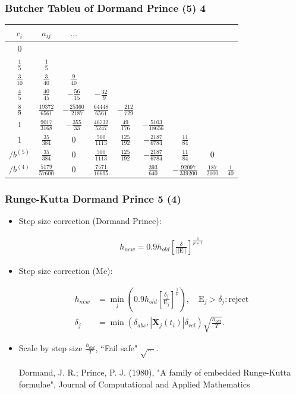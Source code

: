 \documentclass{beamer}
\begin{document}
\begin{frame}
\frametitle{Butcher Tableu of Dormand Prince (5) 4}
\begin{tabular}{c | @{\quad} c @{\quad} c @{\quad} c @{\quad} c @{\quad} c @{\quad} c @{\quad} c @{\quad} c}
$c_i$ & $a_{ij}$ & $\hdots$\\
\midrule
$0$ \\
$\frac{1}{5}$ & $\frac{1}{5}$\\
$\frac{3}{10}$ & $\frac{3}{40}$ &  $\frac{9}{40}$\\
$\frac{4}{5}$ & $\frac{40}{45}$ &  $-\frac{56}{15}$  &  $-\frac{32}{9}$\\
$\frac{8}{9}$ & $\frac{19372}{6561}$ & $-\frac{25360}{2187}$ & $\frac{64448}{6561}$ & $-\frac{212}{729}$\\
$1$ & $\frac{9017}{3168}$ & $-\frac{355}{33}$ & $\frac{46732}{5247}$ & $\frac{49}{176}$  & $-\frac{5103}{18656}$\\
$1$ & $\frac{35}{384}$  & $0$	 & $\frac{500}{1113}$ & $\frac{125}{192}$ & $-\frac{2187}{6784}$ & $\frac{11}{84}$\\
\midrule
$/b^{(5)}$  & $\frac{35}{384}$ & $0$ & $\frac{500}{1113}$ & $\frac{125}{192}$ & $-\frac{2187}{6784}$ & $\frac{11}{84}$ & $0$\\
$/b^{(4)}$ & $\frac{5179}{57600}$ & $0$ & $\frac{7571}{16695}$ & & $\frac{393}{640}$ & $-\frac{92097}{339200}$& $\frac{187}{2100}$ & $\frac{1}{40}$
\end{tabular}
\end{frame}

\begin{frame}
\frametitle{Runge-Kutta Dormand Prince 5 (4)}

\begin{itemize}
\item <1-> Step size correction (Dormand Prince):

\begin{align*}
h_{new} = 0.9 h_{old} \left[\frac{\delta }{||\mathrm{E}||}\right]^{\frac{1}{p+1}}
\end{align*}

\item <2-> Step size correction (Me):

\begin{align*}
h_{new} &= \min_j \left(0.9 h_{old} \left[\frac{\delta_j}{\mathrm{E}_{j}}\right]^{\frac{1}{p}}\right), \quad \mathrm{E}_j>\delta_j : \mathrm{reject}\\
\delta_j &=\min(\delta_{abs},|\mathbf{X}_j(t_{i})|\delta_{rel})\sqrt{\frac{h_{old}}{T}}.
\end{align*}

\item <3-> Scale by step size $\frac{h_{old}}{T}$, ``Fail safe" $\sqrt{\ldots}$.

{\color{gray} Dormand, J. R.; Prince, P. J. (1980), "A family of embedded Runge-Kutta formulae", Journal of Computational and Applied Mathematics}
\end{itemize}
\end{frame}
\end{document}
